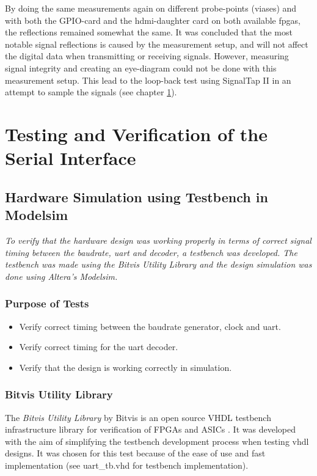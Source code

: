\documentclass[main.tex]{subfiles}
\begin{document}
By doing the same measurements again on different probe-points (viases) and with both the GPIO-card and the \gls{hdmi}-daughter card on both available \glspl{fpga}, the reflections remained somewhat the same. It was concluded that the most notable signal reflections is caused by the measurement setup, and will not affect the digital data when transmitting or receiving signals. However, measuring signal integrity and creating an eye-diagram could not be done with this measurement setup. This lead to the loop-back test using SignalTap II in an attempt to sample the signals (see chapter \ref{chap:sertest}).

\section{Testing and Verification of the Serial Interface} \label{chap:sertest}

\subsection{Hardware Simulation using Testbench in Modelsim}

\textit{To verify that the hardware design was working properly in terms of correct signal timing between the baudrate, \acrshort{uart} and decoder, a testbench was developed. The testbench was made using the \textit{Bitvis Utility Library} and the design simulation was done using Altera's Modelsim.}

\subsubsection{Purpose of Tests}

\begin{itemize}\setlength{\itemsep}{10pt}
\item Verify correct timing between the baudrate generator, clock and uart.
\item Verify correct timing for the uart decoder.
\item Verify that the design is working correctly in simulation.
\end{itemize}

\subsubsection{Bitvis Utility Library}
The \textit{Bitvis Utility Library} by Bitvis is an open source VHDL testbench infrastructure library for verification of FPGAs and ASICs \cite{bitvis16}. It was developed with the aim of simplifying the testbench development process when testing \acrshort{vhdl} designs. It was chosen for this test because of the ease of use and fast implementation (see uart\_tb.vhd for testbench implementation).\\
\end{document}
